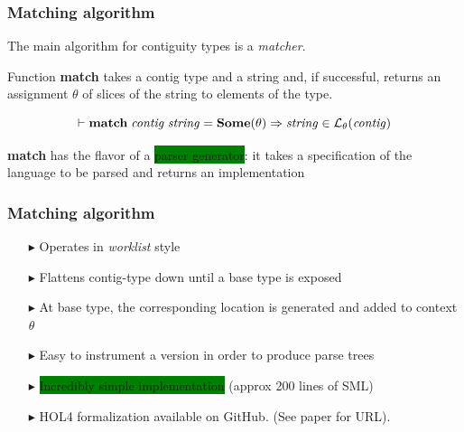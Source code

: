 \documentclass{beamer}
\newcommand{\imp}{\Rightarrow}
\newcommand{\gemph}[1]{\colorbox{green}{#1}}
\newcommand{\konst}[1]{\ensuremath{\mbox{\bf{#1}}}}
\newcommand{\LangTheta}[1]{\ensuremath{{\mathcal L}_{\theta}({#1})}}
\begin{document}
\begin{frame}\frametitle{Matching algorithm}

  The main algorithm for contiguity types is a \emph{matcher}.

Function \textbf{match} takes a contig type and a string and, if
successful, returns an assignment $\theta$ of slices of the string to
elements of the type.

\begin{theorem}[Soundness]
  \[
 \vdash \konst{match}\; \mathit{contig}\; \mathit{string} = \konst{Some}(\theta) \imp
   \mathit{string} \in \LangTheta{\mathit{contig}}
\]
\end{theorem}

\textbf{match} has the flavor of a \gemph{parser generator}: it takes a
specification of the language to be parsed and returns an implementation

\end{frame}


\begin{frame}[fragile]\frametitle{Matching algorithm}

\begin{itemize}

\item [$\blacktriangleright$] Operates in \emph{worklist} style

\item [$\blacktriangleright$] Flattens contig-type down until a base type is exposed

\item [$\blacktriangleright$] At base type, the corresponding location
  is generated and added to context $\theta$

\item [$\blacktriangleright$] Easy to instrument a version in order to produce parse trees

\item [$\blacktriangleright$] \gemph{Incredibly simple implementation} (approx 200 lines of SML)

\item [$\blacktriangleright$] HOL4 formalization available on GitHub. (See paper for URL).

\end{itemize}

\end{frame}
\end{document}
